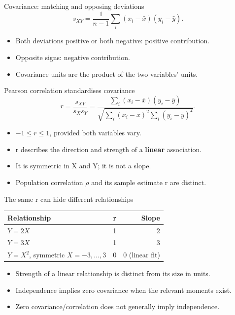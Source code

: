 \begin{frame}{Covariance: matching and opposing deviations}
\[
s_{XY}=\frac1{n-1}\sum_i(x_i-\bar x)(y_i-\bar y).
\]
\begin{itemize}\item Both deviations positive or both negative: positive contribution.\item Opposite signs: negative contribution.\item Covariance units are the product of the two variables' units.\end{itemize}
\end{frame}
\begin{frame}{Pearson correlation standardises covariance}
\[
r=\frac{s_{XY}}{s_Xs_Y}=\frac{\sum_i(x_i-\bar x)(y_i-\bar y)}{\sqrt{\sum_i(x_i-\bar x)^2\sum_i(y_i-\bar y)^2}}.
\]
\begin{itemize}\item $-1\le r\le1$, provided both variables vary.\item r describes the direction and strength of a \textbf{linear} association.\item It is symmetric in X and Y; it is not a slope.\item Population correlation $\rho$ and its sample estimate r are distinct.\end{itemize}
\end{frame}
\begin{frame}{The same r can hide different relationships}
\begin{center}\begin{tabular}{lrr}\toprule
Relationship & r & Slope\\\midrule
$Y=2X$ & 1 & 2\\
$Y=3X$ & 1 & 3\\
$Y=X^2$, symmetric $X=-3,\ldots,3$ & 0 & 0 (linear fit)\\\bottomrule
\end{tabular}\end{center}
\begin{itemize}\item Strength of a linear relationship is distinct from its size in units.\item Independence implies zero covariance when the relevant moments exist.\item Zero covariance/correlation does not generally imply independence.\end{itemize}
\end{frame}
